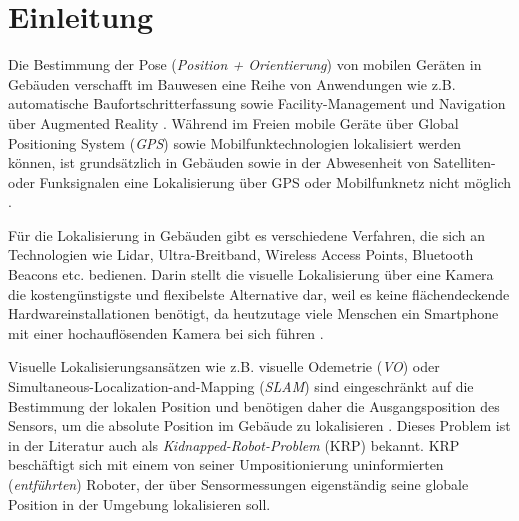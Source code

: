 
\section{Einleitung}
%
%
%
%
%
%
%
%
%
%
%
%
%
%



Die Bestimmung der Pose (\textit{Position + Orientierung}) von mobilen Geräten in Gebäuden verschafft im Bauwesen eine Reihe von Anwendungen wie z.B. automatische Baufortschritterfassung sowie Facility-Management und Navigation über Augmented Reality \cite{kroppModelbasedPoseEstimation2016, kochNaturalMarkersAugmented2014}.
Während im Freien mobile Geräte über Global Positioning System (\textit{GPS}) sowie Mobilfunktechnologien lokalisiert werden können, ist grundsätzlich in Gebäuden sowie in der Abwesenheit von Satelliten- oder Funksignalen eine Lokalisierung über GPS oder Mobilfunknetz nicht möglich \cite{yassinRecentAdvancesIndoor2016}. 

Für die Lokalisierung in Gebäuden gibt es verschiedene Verfahren, die sich an Technologien wie Lidar, Ultra-Breitband, Wireless Access Points, Bluetooth Beacons etc. bedienen. Darin stellt die visuelle Lokalisierung über eine Kamera die kostengünstigste und flexibelste Alternative dar, weil es keine flächendeckende Hardwareinstallationen benötigt, da heutzutage viele Menschen ein Smartphone mit einer hochauflösenden Kamera bei sich führen \cite{wuImageBasedCamera2016}.

Visuelle Lokalisierungsansätzen wie z.B. 
visuelle Odemetrie (\textit{VO}) oder Simultaneous-Localization-and-Mapping (\textit{SLAM}) sind eingeschränkt auf die Bestimmung der lokalen Position und benötigen daher die Ausgangsposition des Sensors, um die absolute Position im Gebäude zu lokalisieren \cite{stephenseGlobalLocalizationUsing2002}. Dieses Problem ist in der Literatur auch als \textit{Kidnapped-Robot-Problem} (KRP) bekannt. KRP beschäftigt sich mit einem von seiner Umpositionierung uninformierten (\textit{entführten}) Roboter, der über Sensormessungen eigenständig seine globale Position in der Umgebung lokalisieren soll.


